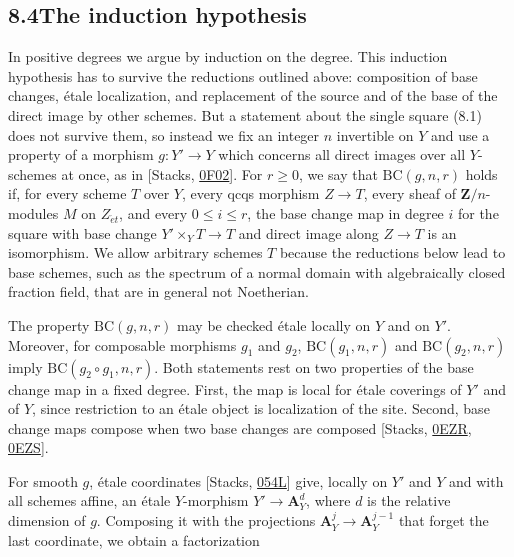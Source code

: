 \documentclass[11pt]{article}
\begin{document}
\subsection*{\texorpdfstring{8.4\quad The induction hypothesis}{8.4 The induction hypothesis}}
\label{bp649}%
\label{bp650}%
In positive degrees we argue by induction on the degree. This induction hypothesis has to survive the reductions outlined above: composition of base changes, étale localization, and replacement of the source and of the base of the direct image by other schemes. But a statement about the single square (8.1) does not survive them, so instead we fix an integer \(n\) invertible on \(Y\) and use a property of a morphism \(g:Y'\to Y\) which concerns all direct images over all \(Y\)-schemes at once, as in [Stacks, \href{https://stacks.math.columbia.edu/tag/0F02}{0F02}]. For \(r\geq0\), we say that \(\mathrm{BC}(g,n,r)\) holds if, for every scheme \(T\) over \(Y\), every qcqs morphism \(Z\to T\), every sheaf of \(\mathbf Z/n\)-modules \(M\) on \(Z_{\acute{e}t}\), and every \(0\leq i\leq r\), the base change map in degree \(i\) for the square with base change \(Y'\times_YT\to T\) and direct image along \(Z\to T\) is an isomorphism. We allow arbitrary schemes \(T\) because the reductions below lead to base schemes, such as the spectrum of a normal domain with algebraically closed fraction field, that are in general not Noetherian.

The property \(\mathrm{BC}(g,n,r)\) may be checked étale locally on \(Y\) and on \(Y'\). Moreover, for composable morphisms \(g_1\) and \(g_2\), \(\mathrm{BC}(g_1,n,r)\) and \(\mathrm{BC}(g_2,n,r)\) imply \(\mathrm{BC}(g_2\circ g_1,n,r)\). Both statements rest on two properties of the base change map in a fixed degree. First, the map is local for étale coverings of \(Y'\) and of \(Y\), since restriction to an étale object is localization of the site. Second, base change maps compose when two base changes are composed [Stacks, \href{https://stacks.math.columbia.edu/tag/0EZR}{0EZR}, \href{https://stacks.math.columbia.edu/tag/0EZS}{0EZS}].

For smooth \(g\), étale coordinates [Stacks, \href{https://stacks.math.columbia.edu/tag/054L}{054L}] give, locally on \(Y'\) and \(Y\) and with all schemes affine, an étale \(Y\)-morphism \(Y'\to\mathbf A^d_Y\), where \(d\) is the relative dimension of \(g\). Composing it with the projections \(\mathbf A^{j}_Y\to\mathbf A^{j-1}_Y\) that forget the last coordinate, we obtain a factorization
\end{document}
